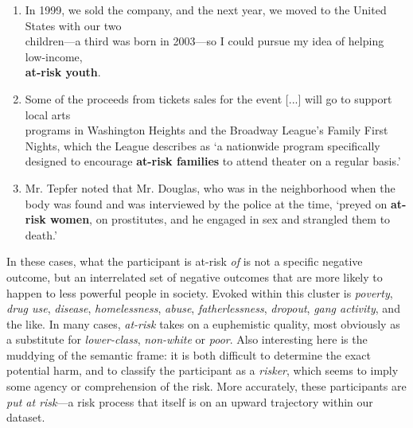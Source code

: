 \begin{enumerate}    [before=\color{black}\ttfamily] \setlength\itemsep{0em} \small
\item In 1999, we sold the company, and the next year, we moved to the United States with our two \\ children---a third was born in 2003---so I could pursue my idea of helping low-income, \\ \textbf{at-risk youth}.
\item Some of the proceeds from tickets sales for the event {[}...{]} will go to support local arts \\ programs in Washington Heights and the Broadway League's Family First Nights, which the League describes as `a nationwide program specifically designed to encourage \textbf{at-risk families} to attend theater on a regular basis.'
\item Mr. Tepfer noted that Mr. Douglas, who was in the neighborhood when the body was found and was interviewed by the police at the time, `preyed on \textbf{at-risk women}, on prostitutes, and he engaged in sex and strangled them to death.'
\end{enumerate}
% 
In these cases, what the participant is at-risk \emph{of} is not a specific negative outcome, but an interrelated set of negative outcomes that are more likely to happen to less powerful people in society. Evoked within this cluster is \emph{poverty}, \emph{drug use}, \emph{disease}, \emph{homelessness}, \emph{abuse}, \emph{fatherlessness}, \emph{dropout}, \emph{gang activity}, and the like. In many cases, \emph{at-risk} takes on a euphemistic quality, most obviously as a substitute for \emph{lower-class}, \emph{non-white} or \emph{poor}. Also interesting here is the muddying of the semantic frame: it is both difficult to determine the exact potential harm, and to classify the participant as a \emph{risker}, which seems to imply some agency or comprehension of the risk. More accurately, these participants are \emph{put at risk}---a risk process that itself is on an upward trajectory within our dataset.~ 

